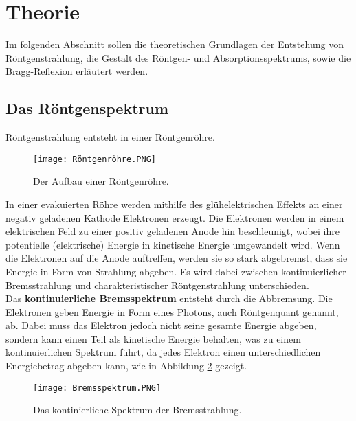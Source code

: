 \section{Theorie} 
\label{sec:theorie}

    Im folgenden Abschnitt sollen die theoretischen Grundlagen der Entstehung von Röntgenstrahlung,
    die Gestalt des Röntgen- und Absorptionsspektrums, 
    sowie die Bragg-Reflexion erläutert werden.

\subsection{Das Röntgenspektrum}

    Röntgenstrahlung entsteht in einer Röntgenröhre.\\

    \begin{figure}
        \centering 
        \texttt{[image: Röntgenröhre.PNG]}
        \caption{Der Aufbau einer Röntgenröhre.}
        \label{fig:Röntgenröhre}
    \end{figure}

    In einer evakuierten Röhre werden mithilfe des glühelektrischen Effekts an einer negativ geladenen Kathode Elektronen erzeugt.
    Die Elektronen werden in einem elektrischen Feld zu einer positiv geladenen Anode hin beschleunigt,
    wobei ihre potentielle (elektrische) Energie in kinetische Energie umgewandelt wird.
    Wenn die Elektronen auf die Anode auftreffen,
    werden sie so stark abgebremst,
    dass sie Energie in Form von Strahlung abgeben.
    Es wird dabei zwischen kontinuierlicher Bremsstrahlung und charakteristischer Röntgenstrahlung unterschieden.\\
    Das \textbf{kontinuierliche Bremsspektrum} entsteht durch die Abbremsung.
    Die Elektronen geben Energie in Form eines Photons, 
    auch Röntgenquant genannt,
    ab.
    Dabei muss das Elektron jedoch nicht seine gesamte Energie abgeben,
    sondern kann einen Teil als kinetische Energie behalten,
    was zu einem kontinuierlichen Spektrum führt,
    da jedes Elektron einen unterschiedlichen Energiebetrag abgeben kann,
    wie in Abbildung \ref{fig:Bremsspektrum} gezeigt. 

    \begin{figure}
        \centering
        \texttt{[image: Bremsspektrum.PNG]}
        \caption{Das kontinierliche Spektrum der Bremsstrahlung.}
        \label{fig:Bremsspektrum}
    \end{figure}
    
